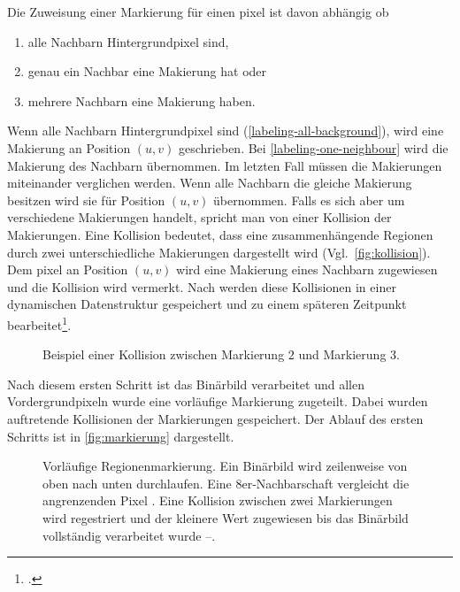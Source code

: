 Die Zuweisung einer Markierung für einen \gls{pixel} ist davon abhängig ob

\begin{enumerate}
	\item alle Nachbarn Hintergrundpixel sind, \label{labeling-all-background}
	\item genau ein Nachbar eine Makierung hat oder \label{labeling-one-neighbour}
	\item mehrere Nachbarn eine Makierung haben. \label{labeling-many-neighbours}
\end{enumerate}

Wenn alle Nachbarn Hintergrundpixel sind (\autoref{labeling-all-background}), wird eine Makierung an Position $(u,v)$
 geschrieben. Bei \autoref{labeling-one-neighbour} wird die Makierung des Nachbarn übernommen. Im letzten Fall müssen
 die Makierungen miteinander verglichen werden. Wenn alle Nachbarn die gleiche Makierung besitzen wird sie für Position
 $(u,v)$ übernommen. Falls es sich aber um verschiedene Makierungen handelt, spricht man von einer Kollision der
 Makierungen. Eine Kollision bedeutet, dass eine zusammenhängende Regionen durch zwei unterschiedliche Makierungen
 dargestellt wird (Vgl.~\autoref{fig:kollision}). Dem \gls{pixel} an Position $(u,v)$ wird eine Makierung eines Nachbarn
 zugewiesen und die Kollision wird vermerkt. Nach \citeauthor{burger05} werden diese Kollisionen in einer dynamischen
 Datenstruktur gespeichert und zu einem späteren Zeitpunkt bearbeitet\footcite[Vgl.][S.~203--204]{burger05}.

\begin{figure}[!ht]
	\centering
	
	\caption{Beispiel einer Kollision zwischen Markierung $2$ und Markierung $3$.}
	\label{fig:kollision}
\end{figure}

Nach diesem ersten Schritt ist das Binärbild verarbeitet und allen Vordergrundpixeln wurde eine vorläufige Markierung
 zugeteilt. Dabei wurden auftretende Kollisionen der Markierungen gespeichert. Der Ablauf des ersten Schritts ist in
 \autoref{fig:markierung} dargestellt.

\begin{figure}[!ht]
	\centering
	\subfigure[]{
		\label{fig:markierung-binaer}
		
	}
	\subfigure[]{
		\label{fig:markierung-1}
		
	}
	\subfigure[]{
		\label{fig:markierung-2}
		
	}
	\subfigure[]{
		\label{fig:markierung-3}
		
	}
	\caption{Vorläufige Regionenmarkierung. Ein Binärbild  wird zeilenweise von
	 oben nach unten durchlaufen. Eine 8er-Nachbarschaft vergleicht die angrenzenden Pixel .
	 Eine Kollision zwischen zwei Markierungen wird regestriert und der kleinere Wert zugewiesen bis das Binärbild
	 vollständig verarbeitet wurde --.}
	\label{fig:markierung}
\end{figure}

